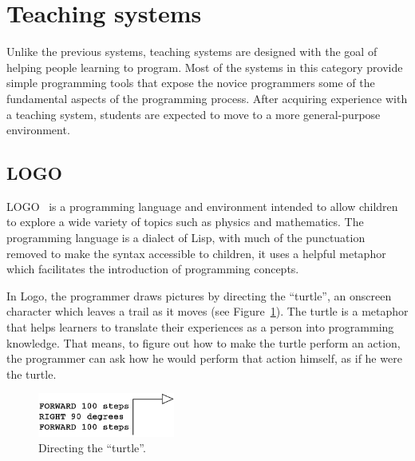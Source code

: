\section{Teaching systems}
\label{sec:ts}
Unlike the previous systems, teaching systems are designed with the goal of helping people learning to program. Most of the systems in this category provide simple programming tools that expose the novice programmers some of the fundamental aspects of the programming process. After acquiring experience with a teaching system, students are expected to move to a more general-purpose environment. 

\subsection{LOGO} 
\label{subsec:logo}
LOGO~\citep{papert1980mindstorms} is a programming language and environment intended to allow children to explore a wide variety of topics such as physics and mathematics. The programming language is a dialect of Lisp, with much of the punctuation removed to make the syntax accessible to children, it uses a helpful metaphor which facilitates the introduction of programming concepts.

In Logo, the programmer draws pictures by directing the ``turtle'', an onscreen character which leaves a trail as it moves (see Figure~\ref{fig:turtle}). The turtle is a metaphor that helps learners to translate their experiences as a person into programming knowledge. That means, to figure out how to make the turtle perform an action, the programmer can ask how he would perform that action himself, as if he were the turtle.

\begin{figure}
  \begin{center}
    \includegraphics[width=0.4\textwidth]{images/turtle}
  \end{center}
 \caption{Directing the ``turtle''.}  
    \label{fig:turtle}
\end{figure}

